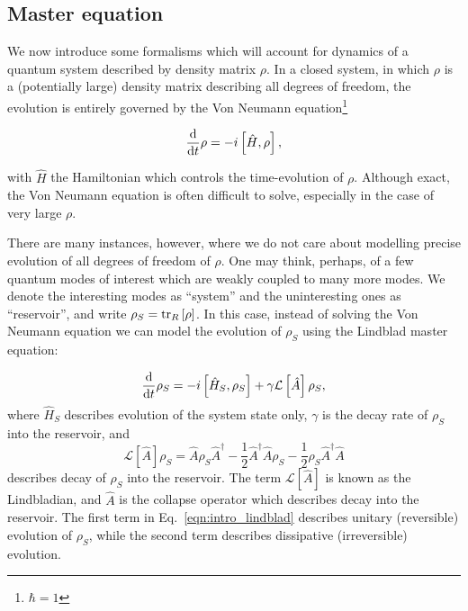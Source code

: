 \FloatBarrier
\subsection{Master equation}

We now introduce some formalisms which will account for dynamics of a quantum system described by density matrix $\rho$. In a closed system, in which $\rho$ is a (potentially large) density matrix describing all degrees of freedom, the evolution is entirely governed by the Von Neumann equation\footnote{$\hbar = 1$}

\begin{equation}
\frac{\mathrm{d}}{\mathrm{d}t} \rho = - i \left[\hat{H}, \rho \right],
\end{equation}

\noindent with $\hat{H}$ the Hamiltonian which controls the time-evolution of $\rho$. Although exact, the Von Neumann equation is often difficult to solve, especially in the case of very large $\rho$.

There are many instances, however, where we do not care about modelling precise evolution of all degrees of freedom of $\rho$. One may think, perhaps, of a few quantum modes of interest which are weakly coupled to many more modes. We denote the interesting modes as ``system'' and the uninteresting ones as ``reservoir'', and write $\rho_S = \tr_R\left[\rho\right]$. In this case, instead of solving the Von Neumann equation we can model the evolution of $\rho_S$ using the Lindblad master equation:

\begin{equation}\label{eqn:intro_lindblad}
\frac{\mathrm{d}}{\mathrm{d}t} \rho_S = - i \left[ \hat{H}_S, \rho_S \right] + \gamma \mathcal{L}\left[\hat{A}\right] \rho_S,
\end{equation}
where $\hat{H}_S$ describes evolution of the system state only, $\gamma$ is the decay rate of $\rho_S$ into the reservoir, and 
\begin{equation}
\mathcal{L}\left[\hat{A}\right] \rho_S = \hat{A} \rho_S \hat{A}^\dagger - \frac{1}{2} \hat{A}^\dagger \hat{A} \rho_S - \frac{1}{2} \rho_S \hat{A}^\dagger \hat{A}
\end{equation}
describes decay of $\rho_S$ into the reservoir. The term $\mathcal{L}\left[\hat{A}\right]$ is known as the Lindbladian, and $\hat{A}$ is the collapse operator which describes decay into the reservoir. The first term in Eq.~\ref{eqn:intro_lindblad} describes unitary (reversible) evolution of $\rho_S$, while the second term describes dissipative (irreversible) evolution.


